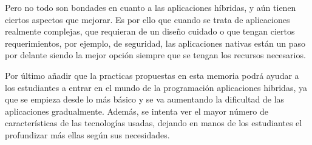 Pero no todo son bondades en cuanto a las aplicaciones híbridas, y aún tienen ciertos aspectos que mejorar. Es por ello que cuando se trata de aplicaciones realmente complejas, que requieran de un diseño cuidado o que tengan ciertos requerimientos, por ejemplo, de seguridad, las aplicaciones nativas están un paso por delante siendo la mejor opción siempre que se tengan los recursos necesarios.

Por último añadir que la practicas propuestas en esta memoria podrá ayudar a los estudiantes a entrar en el mundo de la programación aplicaciones hibridas, ya que se empieza desde lo más básico y se va aumentando la dificultad de las aplicaciones gradualmente. Además, se intenta ver el mayor número de características de las tecnologías usadas, dejando en manos de los estudiantes el profundizar más ellas según sus necesidades.
